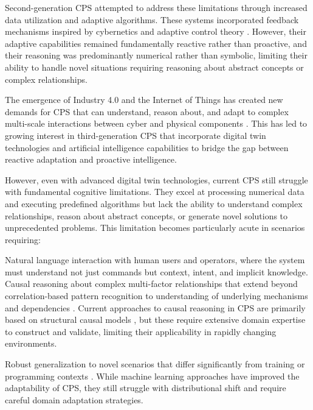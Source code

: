 Second-generation CPS attempted to address these limitations through increased data utilization and adaptive algorithms. These systems incorporated feedback mechanisms inspired by cybernetics and adaptive control theory \cite{ashby1956introduction}. However, their adaptive capabilities remained fundamentally reactive rather than proactive, and their reasoning was predominantly numerical rather than symbolic, limiting their ability to handle novel situations requiring reasoning about abstract concepts or complex relationships.

The emergence of Industry 4.0 and the Internet of Things has created new demands for CPS that can understand, reason about, and adapt to complex multi-scale interactions between cyber and physical components \cite{lasi2014industry, xu2018industry}. This has led to growing interest in third-generation CPS that incorporate digital twin technologies \cite{tao2018digital, grieves2014digital} and artificial intelligence capabilities to bridge the gap between reactive adaptation and proactive intelligence.

However, even with advanced digital twin technologies, current CPS still struggle with fundamental cognitive limitations. They excel at processing numerical data and executing predefined algorithms but lack the ability to understand complex relationships, reason about abstract concepts, or generate novel solutions to unprecedented problems. This limitation becomes particularly acute in scenarios requiring:

Natural language interaction with human users and operators, where the system must understand not just commands but context, intent, and implicit knowledge. Causal reasoning about complex multi-factor relationships that extend beyond correlation-based pattern recognition to understanding of underlying mechanisms and dependencies \cite{pearl2019seven, peters2017elements}. Current approaches to causal reasoning in CPS are primarily based on structural causal models \cite{pearl2000causality, spirtes2000causation}, but these require extensive domain expertise to construct and validate, limiting their applicability in rapidly changing environments.

Robust generalization to novel scenarios that differ significantly from training or programming contexts \cite{hendrycks2019natural, koh2021wilds}. While machine learning approaches have improved the adaptability of CPS, they still struggle with distributional shift and require careful domain adaptation strategies.

